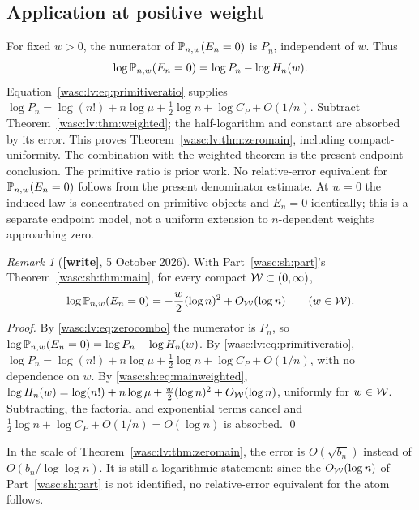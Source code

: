\documentclass[11pt,a4paper]{article}
\theoremstyle{remark}\newtheorem{remark}[theorem]{Remark}
\numberwithin{equation}{section}
\newcommand{\wtag}{\textup{\textbf{[write]}}}
\begin{document}
\subsection{Application at positive weight}
For fixed $w>0$, the numerator of $\mathbb P_{n,w}(E_n=0)$ is $P_n$, independent of $w$. Thus
\[
\log\mathbb P_{n,w}(E_n=0)=\log P_n-\log H_n(w).
\]
Equation~\eqref{wasc:lv:eq:primitiveratio} supplies
$\log P_n=\log(n!)+n\log\mu+\tfrac12\log n+\log C_P+O(1/n)$.
Subtract Theorem~\ref{wasc:lv:thm:weighted}; the half-logarithm and constant are absorbed by its error. This proves Theorem~\ref{wasc:lv:thm:zeromain}, including compact-uniformity.
The combination with the weighted theorem is the present endpoint conclusion. The primitive ratio is prior work. No relative-error equivalent for $\mathbb P_{n,w}(E_n=0)$ follows from the present denominator estimate.
At $w=0$ the induced law is concentrated on primitive objects and $E_n=0$ identically; this is a separate endpoint model, not a uniform extension to $n$-dependent weights approaching zero.
\begin{remark}[\wtag, 5 October 2026]\label{wasc:lv:rem:zerosharp}
With Part~\ref{wasc:sh:part}'s Theorem~\ref{wasc:sh:thm:main}, for every compact $\mathcal W\subset(0,\infty)$,
\[
\log\mathbb P_{n,w}(E_n=0)=-\frac w2(\log n)^2+O_{\mathcal W}(\log n)\qquad(w\in\mathcal W).
\]
\emph{Proof.} By \eqref{wasc:lv:eq:zerocombo} the numerator is $P_n$, so $\log\mathbb P_{n,w}(E_n=0)=\log P_n-\log H_n(w)$. By \eqref{wasc:lv:eq:primitiveratio}, $\log P_n=\log(n!)+n\log\mu+\frac12\log n+\log C_P+O(1/n)$, with no dependence on $w$. By \eqref{wasc:sh:eq:mainweighted}, $\log H_n(w)=\log(n!)+n\log\mu+\frac w2(\log n)^2+O_{\mathcal W}(\log n)$, uniformly for $w\in\mathcal W$. Subtracting, the factorial and exponential terms cancel and $\frac12\log n+\log C_P+O(1/n)=O(\log n)$ is absorbed. \qed

In the scale of Theorem~\ref{wasc:lv:thm:zeromain}, the error is $O(\sqrt{b_n})$ instead of $O(b_n/\log\log n)$. It is still a logarithmic statement: since the $O_{\mathcal W}(\log n)$ of Part~\ref{wasc:sh:part} is not identified, no relative-error equivalent for the atom follows.
\end{remark}
\end{document}
